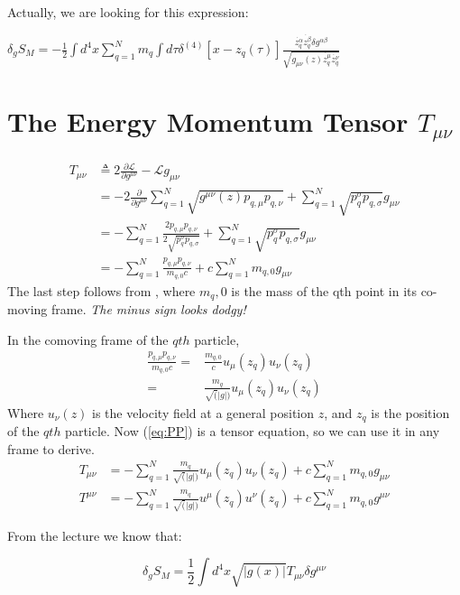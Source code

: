\documentclass[]{article}
\newcommand{\Lagr}{\mathscr{L}}
\begin{document}
Actually, we are looking for this expression:

$\delta_{g}S_M = -\frac{1}{2} \int d^4 x \sum_{q=1}^{N} m_q \int d\tau \delta^{(4)}[x-z_q(\tau)]\frac{\dot{z_q^\alpha}\dot{z_q^\beta}\delta {g^{\alpha\beta}}}{\sqrt{g_{\mu\nu}(z)\dot{z_q^\mu}\dot{z_q^\nu}}}$




\section{The Energy Momentum Tensor $T_{\mu\nu}$}

\begin{align}
T_{\mu\nu}&\triangleq 2 \frac{\partial \Lagr}{\partial g^{\mu\nu}} - \Lagr g_{\mu\nu} \label{eq:T}\\
&= -2 \frac{\partial }{\partial g^{\mu\nu}}\sum_{q=1}^N \sqrt{g^{\mu\nu}(z) p_{q,\mu} p_{q,\nu}}+\sum_{q=1}^N \sqrt{ p^{\sigma}_q p_{q,\sigma}} g_{\mu\nu} \\
&= - \sum_{q=1}^N \frac{2 p_{q,\mu} p_{q,\nu}}{2 \sqrt{ p^{\sigma}_q p_{q,\sigma}} }  +\sum_{q=1}^N \sqrt{ p^{\sigma}_q p_{q,\sigma}} g_{\mu\nu} \\
&= - \sum_{q=1}^N \frac{p_{q,\mu} p_{q,\nu}}{ m_{q,0} c }  +c\sum_{q=1}^N   m_{q,0} g_{\mu\nu} 
\end{align}
The last step follows from \cite{wiki_momentum}, where $m_q,0$ is the mass of the qth point in its co-moving frame. \emph{The minus sign looks dodgy!}


In the comoving frame of the $qth$ particle,
\begin{align}
\frac{p_{q,\mu} p_{q,\nu}}{ m_{q,0} c } =& \frac{m_{q,0}}{c}  u_{\mu}(z_q) u_{\nu}(z_q)\\
=& \frac{m_{q}}{\sqrt(|g|)}  u_{\mu}(z_q) u_{\nu}(z_q) \label{eq:PP}
\end{align}
Where $u_{\nu}(z)$ is the velocity field at a general position $z$, and $z_q$ is the position of the $qth$ particle. Now (\ref{eq:PP}) is a tensor equation, so we can use it in any frame to derive.
\begin{align}
T_{\mu\nu} &= - \sum_{q=1}^N  \frac{m_{q}}{\sqrt(|g|)}  u_{\mu}(z_q) u_{\nu}(z_q)  +c\sum_{q=1}^N   m_{q,0} g_{\mu\nu}\\
T^{\mu\nu} &= - \sum_{q=1}^N  \frac{m_{q}}{\sqrt(|g|)}  u^{\mu}(z_q) u^{\nu}(z_q)  +c\sum_{q=1}^N   m_{q,0} g^{\mu\nu}
\end{align}

From the lecture we know that:

$$\delta_g S_M = \frac{1}{2} \int d^4 x \sqrt{|g(x)|} T_{\mu\nu} \delta g^{\mu\nu}$$
\end{document}
